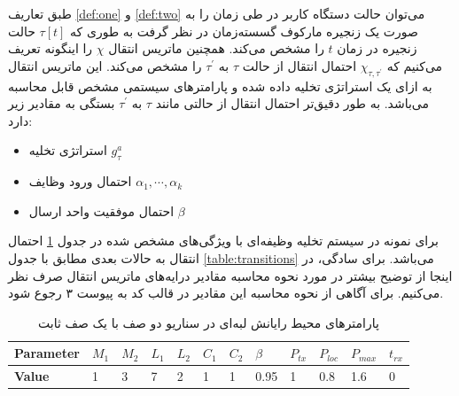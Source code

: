 طبق تعاریف \ref{def:one} و \ref{def:two} می‌توان حالت دستگاه کاربر در طی زمان را به صورت یک زنجیره مارکوف گسسته‌زمان در نظر گرفت به طوری که $\tau[t]$ حالت زنجیره در زمان $t$ را مشخص می‌کند. همچنین ماتریس انتقال $\chi$ را اینگونه تعریف می‌کنیم که $\chi_{\tau, \tau^{\prime}}$ احتمال انتقال از حالت $\tau$ به \(\tau^{\prime}\) را مشخص می‌کند. این ماتریس انتقال به ازای یک استراتژی تخلیه داده شده و پارامترهای سیستمی مشخص قابل محاسبه می‌باشد. به طور دقیق‌تر احتمال انتقال از حالتی مانند 
$\tau$
به 
$\tau^\prime$
بستگی به مقادیر زیر دارد:
\begin{itemize}
	\item استراتژی تخلیه $g_\tau^a$
	\item احتمال ورود وظایف $\alpha_1, \cdots, \alpha_k$
	\item احتمال موفقیت واحد ارسال $\beta$
\end{itemize}
برای نمونه در سیستم تخلیه وظیفه‌ای با ویژگی‌های مشخص شده در جدول \ref{table:fixedranged2} احتمال انتقال به حالات بعدی مطابق با جدول \ref{table:transitions} می‌باشد. برای سادگی، در اینجا از توضیح بیشتر در مورد نحوه محاسبه مقادیر درایه‌های ماتریس انتقال صرف نظر می‌کنیم. برای آگاهی از نحوه محاسبه این مقادیر در قالب کد به پیوست ۳ رجوع شود.
\begin{table}[H]
	\centering
	\begin{latin}
		\begin{tabular}{@{}llllllllllll@{}}
			\toprule
			\textbf{Parameter} & $M_1$ & $M_2$ & $L_1$ & $L_2$ & $C_1$ & $C_2$ & $\beta$ & $P_{tx}$ & $P_{loc}$ & $P_{max}$ & $t_{rx}$ \\ \midrule
			\textbf{Value}     & 1     & 3     & 7     & 2     & 1     & 1     & 0.95    & 1        & 0.8       & 1.6       & 0        \\ \bottomrule
		\end{tabular}
	\end{latin}
	\caption{پارامترهای محیط رایانش لبه‌ای در سناریو دو صف با یک صف ثابت}
	\label{table:fixedranged2}
\end{table}

